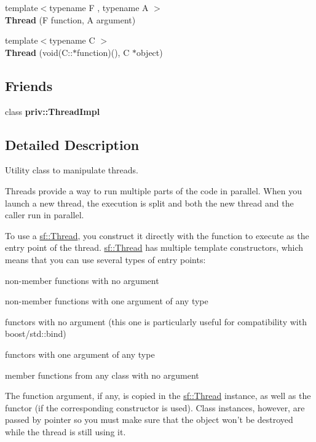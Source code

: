 \begin{DoxyCompactItemize}
\item 
\hypertarget{classsf_1_1_thread_a719b2cc067d92d52c35064a49d850a53}{{\footnotesize template$<$typename F , typename A $>$ }\\{\bfseries Thread} (F function, A argument)}\label{classsf_1_1_thread_a719b2cc067d92d52c35064a49d850a53}

\item 
\hypertarget{classsf_1_1_thread_aa9f473c8cbb078900c62b1fd14a83a34}{{\footnotesize template$<$typename C $>$ }\\{\bfseries Thread} (void(C\+::$\ast$function)(), C $\ast$object)}\label{classsf_1_1_thread_aa9f473c8cbb078900c62b1fd14a83a34}

\end{DoxyCompactItemize}
\subsection*{Friends}
\begin{DoxyCompactItemize}
\item 
\hypertarget{classsf_1_1_thread_a5ed4f3acfcb44de47de196437c39f9ef}{class {\bfseries priv\+::\+Thread\+Impl}}\label{classsf_1_1_thread_a5ed4f3acfcb44de47de196437c39f9ef}

\end{DoxyCompactItemize}


\subsection{Detailed Description}
Utility class to manipulate threads. 

Threads provide a way to run multiple parts of the code in parallel. When you launch a new thread, the execution is split and both the new thread and the caller run in parallel.

To use a \hyperlink{classsf_1_1_thread}{sf\+::\+Thread}, you construct it directly with the function to execute as the entry point of the thread. \hyperlink{classsf_1_1_thread}{sf\+::\+Thread} has multiple template constructors, which means that you can use several types of entry points\+: \begin{DoxyItemize}
\item non-\/member functions with no argument \item non-\/member functions with one argument of any type \item functors with no argument (this one is particularly useful for compatibility with boost/std\+::bind) \item functors with one argument of any type \item member functions from any class with no argument\end{DoxyItemize}
The function argument, if any, is copied in the \hyperlink{classsf_1_1_thread}{sf\+::\+Thread} instance, as well as the functor (if the corresponding constructor is used). Class instances, however, are passed by pointer so you must make sure that the object won't be destroyed while the thread is still using it.

